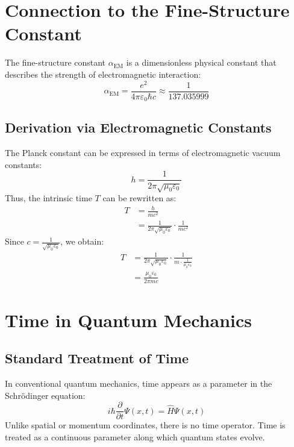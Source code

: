 \documentclass[12pt,a4paper]{article}
\newcommand{\alphaEM}{\alpha_{\text{EM}}}
\begin{document}
	\section{Connection to the Fine-Structure Constant}
	The fine-structure constant \( \alphaEM \) is a dimensionless physical constant that describes the strength of electromagnetic interaction:
	\begin{equation}
		\alphaEM = \frac{e^2}{4\pi\varepsilon_0\hbar c} \approx \frac{1}{137.035999}
	\end{equation}
	
	\subsection{Derivation via Electromagnetic Constants}
	The Planck constant can be expressed in terms of electromagnetic vacuum constants:
	\begin{equation}
		h = \frac{1}{2\pi\sqrt{\mu_0\varepsilon_0}}
	\end{equation}
	Thus, the intrinsic time \( T \) can be rewritten as:
	\begin{align}
		T &= \frac{h}{mc^2} \\
		&= \frac{1}{2\pi\sqrt{\mu_0\varepsilon_0}} \cdot \frac{1}{mc^2}
	\end{align}
	Since \( c = \frac{1}{\sqrt{\mu_0\varepsilon_0}} \), we obtain:
	\begin{align}
		T &= \frac{1}{2\pi\sqrt{\mu_0\varepsilon_0}} \cdot \frac{1}{m \cdot \frac{1}{\mu_0\varepsilon_0}} \\
		&= \frac{\mu_0\varepsilon_0}{2\pi m c}
	\end{align}
	
	\section{Time in Quantum Mechanics}
	\subsection{Standard Treatment of Time}
	In conventional quantum mechanics, time appears as a parameter in the Schrödinger equation:
	\begin{equation}
		i\hbar \frac{\partial}{\partial t}\Psi(x,t) = \hat{H}\Psi(x,t)
	\end{equation}
	Unlike spatial or momentum coordinates, there is no time operator. Time is treated as a continuous parameter along which quantum states evolve.
	
\end{document}

